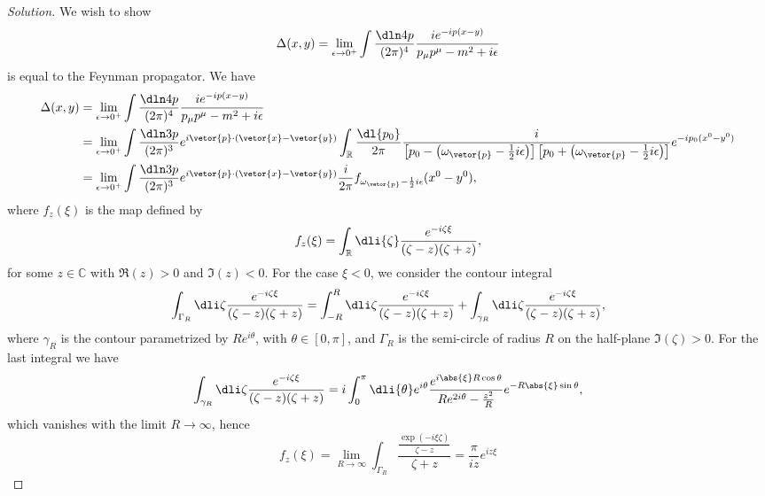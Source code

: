 \begin{proof}[Solution]
   We wish to show
   \begin{equation*}
       \Delta(x,y) = \lim_{\epsilon \to 0^+}{\int \frac{\dln4p}{(2\pi)^4} \frac{i e^{-ip(x - y)}}{p_\mu p^\mu - m^2 + i \epsilon}}
   \end{equation*}
   is equal to the Feynman propagator. We have
   \begin{align*}
      \Delta(x,y)&=\lim_{\epsilon \to 0^+}{\int \frac{\dln4p}{(2\pi)^4} \frac{i e^{-ip(x - y)}}{p_\mu p^\mu - m^2 + i \epsilon}}\\
      &= \lim_{\epsilon \to 0^+}{\int \frac{\dln3p}{(2\pi)^3} e^{i \vetor{p} \cdot (\vetor{x} - \vetor{y})}\int_{\mathbb{R}} \frac{\dl{p_0}}{2\pi} \frac{i}{\left[p_0 - \left(\omega_{\vetor{p}} - \frac12 i\epsilon\right)\right]\left[p_0 + \left(\omega_{\vetor{p}} - \frac12i \epsilon\right)\right]}}e^{-ip_0 (x^0 - y^0)}\\
      &= \lim_{\epsilon \to 0^+}{\int \frac{\dln3p}{(2\pi)^3} e^{i \vetor{p} \cdot (\vetor{x} - \vetor{y})} \frac{i}{2\pi}f_{\omega_{\vetor{p}} - \frac12 i \epsilon}(x^0 - y^0)},
   \end{align*}
   where \(f_{z}(\xi)\) is the map defined by
   \begin{equation*}
      f_{z}(\xi) = \int_{\mathbb{R}} \dli{\zeta} \frac{e^{-i \zeta \xi}}{(\zeta - z)(\zeta + z)},
   \end{equation*}
   for some \(z \in \mathbb{C}\) with \(\Re(z) > 0\) and \(\Im(z) < 0\). For the case \(\xi < 0\), we consider the contour integral
   \begin{equation*}
      \int_{\Gamma_R} \dli\zeta \frac{e^{-i \zeta \xi}}{(\zeta - z)(\zeta + z)} = \int_{-R}^{R} \dli \zeta \frac{e^{-i \zeta \xi}}{(\zeta - z)(\zeta + z)} + \int_{\gamma_R} \dli\zeta \frac{e^{-i \zeta \xi}}{(\zeta - z)(\zeta + z)},
   \end{equation*}
   where \(\gamma_R\) is the contour parametrized by \(Re^{i \theta}\), with \(\theta \in [0, \pi]\), and \(\Gamma_R\) is the semi-circle of radius \(R\) on the half-plane \(\Im(\zeta) > 0\). For the last integral we have
   \begin{equation*}
      \int_{\gamma_R} \dli\zeta \frac{e^{-i \zeta \xi}}{(\zeta - z)(\zeta + z)} = i \int_0^{\pi} \dli{\theta} e^{i\theta} \frac{e^{i\abs{\xi} R \cos\theta}}{R e^{2i\theta} - \frac{z^2}{R}} e^{-R \abs{\xi}\sin\theta},
   \end{equation*}
   which vanishes with the limit \(R \to \infty\), hence
   \begin{equation*}
      f_z(\xi) = \lim_{R \to \infty} \int_{\Gamma_R} \frac{\frac{\exp(-i \xi \zeta)}{\zeta - z}}{\zeta + z} = \frac{\pi}{iz} e^{i z \xi}

\end{equation*}
\end{proof}
